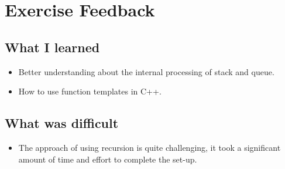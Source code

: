 \documentclass[a4paper, 12pt]{article}
\begin{document}
\section{Exercise Feedback}
\subsection{What I learned}
\begin{flushleft}
  \begin{itemize}
    \item Better understanding about the internal processing of stack and queue.
    \item How to use function templates in C++.
  \end{itemize}
\end{flushleft}
\subsection{What was difficult}
\begin{flushleft}
  \begin{itemize}
    \item The approach of using recursion is quite challenging, it took a significant amount of time and effort to complete the set-up.
  \end{itemize}
\end{flushleft}
\end{document}
